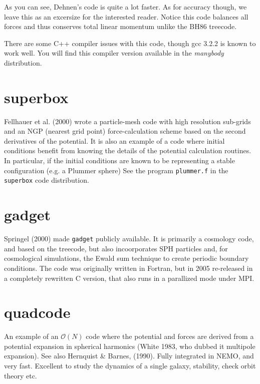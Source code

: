 As you can see, Dehnen's code is quite a lot faster. As for accuracy though, we leave
this as an excersize for the interested reader. Notice this code balances all forces
and thus conserves total linear momentum unlike the BH86 treecode.

\smallskip
There are some C++
compiler issues with this code, though  gcc 3.2.2 is known to work well. You will
find this compiler version available in the {\it manybody} distribution.

\section{superbox}

Fellhauer et al. (2000) wrote a particle-mesh code with high resolution
sub-grids and an NGP (nearest grid point) force-calculation scheme
based on the second derivatives of the potential.  It is also an example of 
a code where initial conditions benefit from knowing the details of the
potential calculation routines. In particular, if the initial conditions
are known to be representing a stable configuration (e.g. a Plummer sphere)
See the program {\tt plummer.f} in the {\tt superbox} code distribution.

\section{gadget}

Springel (2000) made {\tt gadget} publicly available.
It is primarily a cosmology code, and based on the treecode, but also incoorporates 
SPH particles
and, for cosmological simulations, the Ewald sum technique to create periodic
boundary conditions. The code was originally written in Fortran, but in 2005 re-released
in a completely rewritten C version, that also runs in a parallized mode under MPI.


\section{quadcode}


An example of an $\mathcal{O}(N)$ code where the potential and forces are derived from
a potential expansion in spherical harmonics  (White 1983, who dubbed it multipole expansion). 
See also Hernquist \& Barnes, (1990). Fully integrated
in NEMO, and very fast. Excellent to study the dynamics of a single galaxy,
stability, check orbit theory etc.

